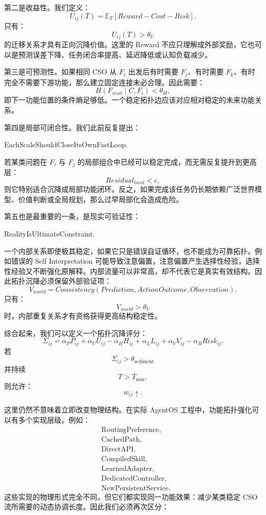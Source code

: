 第二是收益性。我们定义：
\[
U_{ij}(T)
=
\mathbb E_T
\left[
Reward
-
Cost
-
Risk
\right].
\]
只有：
\[
U_{ij}(T)>\theta_U
\]
的迁移关系才具有正向沉降价值。这里的 Reward 不应只理解成外部奖励，它也可以是预测误差下降、任务闭合率提高、延迟降低或认知负载减少。

第三是可预测性。如果相同 CSO 从 $F_i$ 出发后有时需要 $F_j$、有时需要 $F_k$、有时完全不需要下游功能，那么建立固定连接未必合理。因此需要：
\[
H
\left(
F_{next}\mid C,F_i
\right)
<
\theta_H,
\]
即下一功能位置的条件熵足够低。一个稳定拓扑边应该对应相对稳定的未来功能关系。

第四是局部可闭合性。我们此前反复提出：
\begin{statementbox}
EachScaleShouldCloseItsOwnFastLoop.
\end{statementbox}
若某类问题在 $F_i$ 与 $F_j$ 的局部组合中已经可以稳定完成，而无需反复提升到更高层：
\[
Residual_{local}
<
\epsilon,
\]
则它特别适合沉降成局部功能闭环。反之，如果完成该任务仍长期依赖广泛世界模型、价值判断或全局规划，那么过早局部化会造成危险。

第五也是最重要的一条，是现实可验证性：
\begin{statementbox}
RealityIsUltimateConstraint.
\end{statementbox}
一个内部关系即使极其稳定，如果它只是错误自证循环，也不能成为可靠拓扑。例如错误的 Self Interpretation 可能导致注意偏置，注意偏置产生选择性经验，选择性经验又不断强化原解释。内部流量可以非常高，却不代表它是真实有效结构。因此拓扑沉降必须保留外部验证项：
\[
V_{world}
=
Consistency
\left(
Prediction,
ActionOutcome,
Observation
\right).
\]
只有：
\[
V_{world}>\theta_V
\]
时，内部重复关系才有资格获得更高结构稳定性。

综合起来，我们可以定义一个拓扑沉降评分：
\[
\Sigma_{ij}
=
\alpha_P P_{ij}
+
\alpha_U U_{ij}
-
\alpha_H H_{ij}
+
\alpha_L L_{ij}
+
\alpha_V V_{ij}
-
\alpha_R Risk_{ij}.
\]
若
\[
\Sigma_{ij}
>
\theta_{\mathrm{sediment}}
\]
并持续
\[
T>T_{\min},
\]
则允许：
\[
w_{ij}\uparrow.
\]

这里仍然不意味着立即改变物理结构。在实际 AgentOS 工程中，功能拓扑强化可以有多个实现层级。例如：
\[
\begin{aligned}
&\text{RoutingPreference},\\
&\text{CachedPath},\\
&\text{DirectAPI},\\
&\text{CompiledSkill},\\
&\text{LearnedAdapter},\\
&\text{DedicatedController},\\
&\text{NewPersistentService}.
\end{aligned}
\]
这些实现的物理形式完全不同，但它们都实现同一功能效果：减少某类稳定 CSO 流所需要的动态协调长度。因此我们必须再次区分：
\begin{statementbox}
\centering
{}
\end{statementbox}

